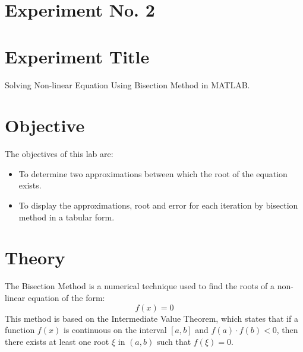 \documentclass[a4paper,12pt]{article}
\begin{document}
	\section{Experiment No. 2}
	
	\section{Experiment Title }
Solving Non-linear Equation Using Bisection Method in MATLAB.
	\section{Objective}
	
	The objectives of this lab are:
	\begin{itemize}
		\item To determine two approximations between which the root of the equation exists.
		\item To display the approximations, root and error for each iteration by bisection method in a
		tabular form.
	
	\end{itemize}
	\section{Theory}
	

	
	The Bisection Method is a numerical technique used to find the roots of a non-linear equation of the form:
	\begin{equation}
		f(x) = 0
	\end{equation}
	This method is based on the Intermediate Value Theorem, which states that if a function \( f(x) \) is continuous on the interval \([a, b]\) and \( f(a) \cdot f(b) < 0 \), then there exists at least one root \( \xi \) in \( (a, b) \) such that \( f(\xi) = 0 \).
	
\end{document}

